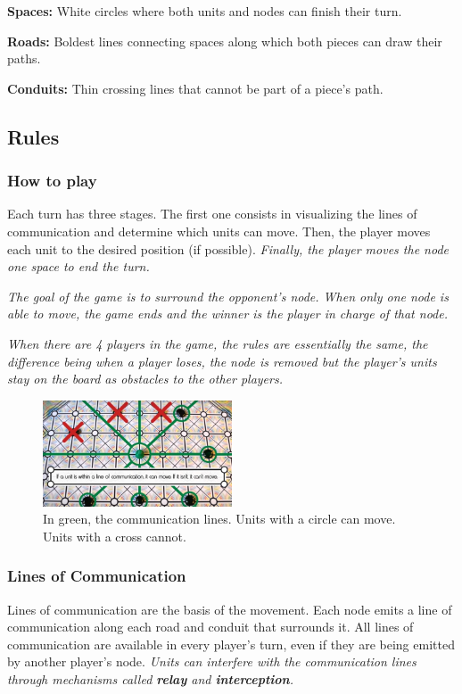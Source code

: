 \documentclass[a4paper]{article}
\begin{document}
\textbf{Spaces: }White circles where both units and nodes can finish their turn.

\textbf{Roads: }Boldest lines connecting spaces along which both pieces can draw their paths.

\textbf{Conduits: }Thin crossing lines that cannot be part of a piece's path.


\subsection{Rules}

\subsubsection{How to play}
Each turn has three stages. The first one consists in visualizing the lines of communication and determine which units can move. Then, the player moves each unit to the desired position (if possible).\textit{ Finally, the player moves the node one space to end the turn. }

\textit{The goal of the game is to surround the opponent's node. When only one node is able to move, the game ends and the winner is the player in charge of that node.}

\textit{When there are 4 players in the game, the rules are essentially the same, the difference being when a player loses, the node is removed but the player's units stay on the board as obstacles to the other players.}

\begin{figure}[h!]
	\centering
	\includegraphics[width=0.5\textwidth]{signallines.jpg}
	\caption{In green, the communication lines. Units with a circle can move. Units with a cross cannot.}
	\label{Image: signallines}
\end{figure}

\subsubsection{Lines of Communication}

Lines of communication are the basis of the movement. Each node emits a line of communication along each road and conduit that surrounds it. All lines of communication are available in every player's turn, even if they are being emitted by another player's node.\textit{ Units can interfere with the communication lines through mechanisms called \textbf{relay} and \textbf{interception}. }
\end{document}
